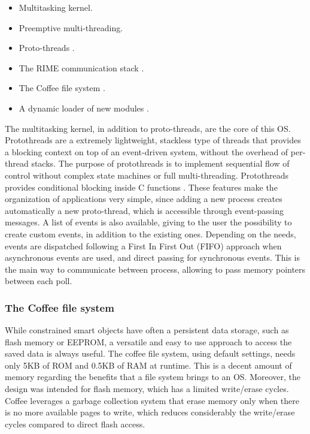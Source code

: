 \begin{itemize}
	\item Multitasking kernel.
	\item Preemptive multi-threading.
	\item Proto-threads \cite{dunkels2006protothreads}.
	\item The RIME communication stack \cite{dunkels2007rime}.
	\item The Coffee file system \cite{tsiftes09enabling}.
	\item A dynamic loader of new modules \cite{dunkels06runtime}.
\end{itemize}

The multitasking kernel, in addition to proto-threads, are the core of this OS.
Protothreads are a extremely lightweight, stackless type of threads that provides a blocking context on top of an event-driven system, without the overhead of per-thread stacks. The purpose of protothreads is to implement sequential flow of control without complex state machines or full multi-threading. Protothreads provides conditional blocking inside C functions \cite{dunkels2006protothreads}.
These features make the organization of applications very simple, since adding a new process creates automatically a new proto-thread, which is accessible through event-passing messages.
A list of events is also available, giving to the user the possibility to create custom events, in addition to the existing ones.
Depending on the needs, events are dispatched following a First In First Out (FIFO) approach when asynchronous events are used, and direct passing for synchronous events.
This is the main way to communicate between process, allowing to pass memory pointers between each poll.

\subsubsection{The Coffee file system}
While constrained smart objects have often a persistent data storage, such as flash memory or EEPROM, a versatile and easy to use approach to access the saved data is always useful.
The coffee file system, using default settings, needs only 5KB of ROM and 0.5KB of RAM at runtime.
This is a decent amount of memory regarding the benefits that a file system brings to an OS.
Moreover, the design was intended for flash memory, which has a limited write/erase cycles.
Coffee leverages a garbage collection system that erase memory only when there is no more available pages to write, which reduces considerably the write/erase cycles compared to direct flash access.

